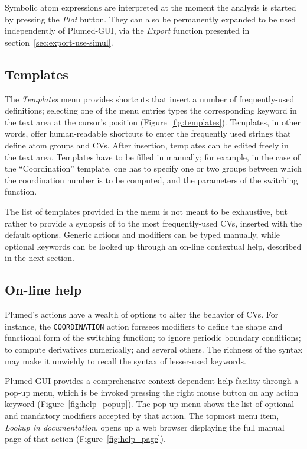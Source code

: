 \documentclass[preprint,review,11pt]{elsarticle}
\begin{document}
Symbolic atom expressions are interpreted at the moment the analysis is
started by pressing the \emph{Plot} button. They can also be
permanently expanded to be used independently of Plumed-GUI, via the
\emph{Export} function presented in section~\ref{sec:export-use-simul}.



\subsection{Templates}

The \emph{Templates} menu provides shortcuts that insert a number of
frequently-used definitions; selecting one of the menu entries types
the corresponding keyword in the text area at the cursor's position
(Figure~\ref{fig:templates}). Templates, in other words, offer
human-readable shortcuts to enter the frequently used strings that
define atom groups and CVs. After insertion, templates can be edited
freely in the text area.
Templates have to be filled in  manually; for example, in the
case of the ``Coordination'' template, one has to specify one or two
groups between which the coordination number is to be computed, and
the parameters of the switching function.

The list of templates provided in the menu is not meant to be
exhaustive, but rather to provide a synopsis of to the most
frequently-used CVs, inserted with the default options. Generic
actions and modifiers can be typed manually, while optional keywords
can be looked up through an on-line contextual help, described
in the next section.


\subsection{On-line help}

Plumed's actions have a wealth of options to alter the
behavior of CVs. For instance, the \texttt{COORDINATION} action
foresees modifiers to define the shape and functional form of the
switching function; to ignore periodic boundary conditions; to compute
derivatives numerically; and several others. The richness of the
syntax may make it unwieldy to recall the syntax of lesser-used
keywords.


Plumed-GUI provides a comprehensive context-dependent help facility
through a pop-up menu, which is be invoked pressing the right mouse
button on any action keyword (Figure~\ref{fig:help_popup}). The pop-up
menu shows the list of optional and mandatory modifiers accepted by
that action.  The topmost menu item, \emph{Lookup in documentation},
opens up a web browser  displaying the full manual page of that action
(Figure~\ref{fig:help_page}).
\end{document}
